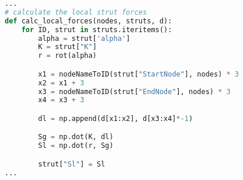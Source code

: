 \begin{inconsolata}
\begin{minipage}{\linewidth}
\begin{lstlisting}[language=python]
...
# calculate the local strut forces
def calc_local_forces(nodes, struts, d):
    for ID, strut in struts.iteritems():
        alpha = strut['alpha']
        K = strut["K"]
        r = rot(alpha)

        x1 = nodeNameToID(strut["StartNode"], nodes) * 3
        x2 = x1 + 3
        x3 = nodeNameToID(strut["EndNode"], nodes) * 3
        x4 = x3 + 3

        dl = np.append(d[x1:x2], d[x3:x4]*-1)

        Sg = np.dot(K, dl)
        Sl = np.dot(r, Sg)

        strut["Sl"] = Sl
...
\end{lstlisting}
\end{minipage}
\end{inconsolata}

